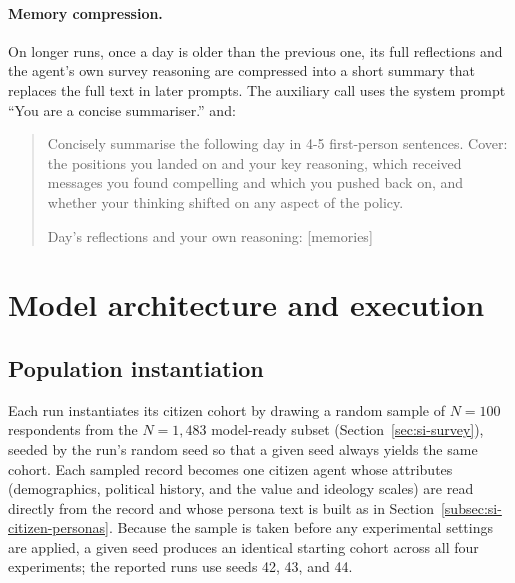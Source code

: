 \documentclass[pdflatex,sn-mathphys-num]{sn-jnl}%
\theoremstyle{thmstyleone}%
\theoremstyle{thmstyletwo}%
\theoremstyle{thmstylethree}%
\begin{document}
\paragraph{Memory compression.}
On longer runs, once a day is older than the previous one, its full reflections and
the agent's own survey reasoning are compressed into a short summary that replaces
the full text in later prompts. The auxiliary call uses the system prompt ``You are
a concise summariser.'' and:
\begin{quote}\small
Concisely summarise the following day in 4-5 first-person sentences. Cover: the
positions you landed on and your key reasoning, which received messages you found
compelling and which you pushed back on, and whether your thinking shifted on any
aspect of the policy.

Day's reflections and your own reasoning:
[memories]
\end{quote}


\section{Model architecture and execution}\label{sec:si-architecture}

\subsection{Population instantiation}\label{subsec:si-instantiation}

Each run instantiates its citizen cohort by drawing a random sample of $N=100$
respondents from the $N=1{,}483$ model-ready subset (Section~\ref{sec:si-survey}),
seeded by the run's random seed so that a given seed always yields the same cohort.
Each sampled record becomes one citizen agent whose attributes (demographics,
political history, and the value and ideology scales) are read directly from the
record and whose persona text is built as in
Section~\ref{subsec:si-citizen-personas}. Because the sample is taken before any
experimental settings are applied, a given seed produces an identical starting
cohort across all four experiments; the reported runs use seeds 42, 43, and 44.
\end{document}
